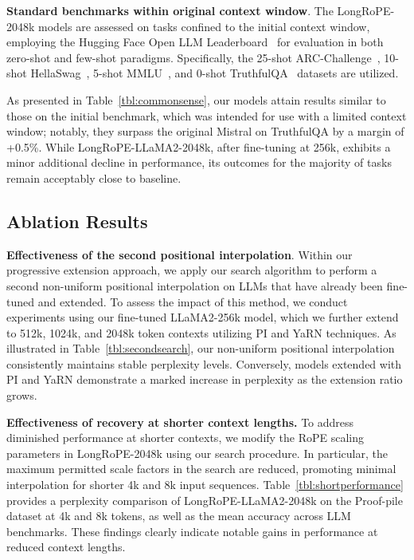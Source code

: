 \textbf{Standard benchmarks within original context window}. The LongRoPE-2048k models are assessed on tasks confined to the initial context window, employing the Hugging Face Open LLM Leaderboard~\cite{huggingfaceboard} for evaluation in both zero-shot and few-shot paradigms. Specifically, the 25-shot ARC-Challenge~\cite{allenai:arc}, 10-shot HellaSwag~\cite{zellers2019hellaswag}, 5-shot MMLU~\cite{mmlu}, and 0-shot TruthfulQA~\cite{lin2021truthfulqa} datasets are utilized.

As presented in Table~\ref{tbl:commonsense}, our models attain results similar to those on the initial benchmark, which was intended for use with a limited context window; notably, they surpass the original Mistral on TruthfulQA by a margin of +0.5\%. While LongRoPE-LLaMA2-2048k, after fine-tuning at 256k, exhibits a minor additional decline in performance, its outcomes for the majority of tasks remain acceptably close to baseline.

\subsection{Ablation Results}

\textbf{Effectiveness of the second positional interpolation}. Within our progressive extension approach, we apply our search algorithm to perform a second non-uniform positional interpolation on LLMs that have already been fine-tuned and extended. To assess the impact of this method, we conduct experiments using our fine-tuned LLaMA2-256k model, which we further extend to 512k, 1024k, and 2048k token contexts utilizing PI and YaRN techniques. As illustrated in Table~\ref{tbl:secondsearch}, our non-uniform positional interpolation consistently maintains stable perplexity levels. Conversely, models extended with PI and YaRN demonstrate a marked increase in perplexity as the extension ratio grows.

\textbf{Effectiveness of recovery at shorter context lengths.} To address diminished performance at shorter contexts, we modify the RoPE scaling parameters in LongRoPE-2048k using our search procedure. In particular, the maximum permitted scale factors in the search are reduced, promoting minimal interpolation for shorter 4k and 8k input sequences. 
Table~\ref{tbl:shortperformance} provides a perplexity comparison of LongRoPE-LLaMA2-2048k on the Proof-pile dataset at 4k and 8k tokens, as well as the mean accuracy across LLM benchmarks. These findings clearly indicate notable gains in performance at reduced context lengths.

